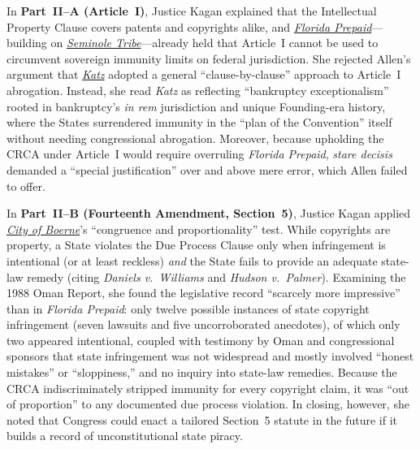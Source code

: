 \documentclass[12pt]{article}
\begin{document}
In \textbf{Part~II--A (Article~I)}, Justice Kagan explained that the Intellectual Property Clause covers patents and copyrights alike, and \href{https://supreme.justia.com/cases/federal/us/527/627/}{\textit{Florida Prepaid}}---building on \href{https://supreme.justia.com/cases/federal/us/517/44/}{\textit{Seminole Tribe}}---already held that Article~I cannot be used to circumvent sovereign immunity limits on federal jurisdiction. She rejected Allen's argument that \href{https://supreme.justia.com/cases/federal/us/546/356/}{\textit{Katz}} adopted a general ``clause-by-clause'' approach to Article~I abrogation. Instead, she read \textit{Katz} as reflecting ``bankruptcy exceptionalism'' rooted in bankruptcy's \textit{in rem} jurisdiction and unique Founding-era history, where the States surrendered immunity in the ``plan of the Convention'' itself without needing congressional abrogation. Moreover, because upholding the CRCA under Article~I would require overruling \textit{Florida Prepaid}, \textit{stare decisis} demanded a ``special justification'' over and above mere error, which Allen failed to offer.

In \textbf{Part~II--B (Fourteenth Amendment, Section~5)}, Justice Kagan applied \href{https://supreme.justia.com/cases/federal/us/521/507/}{\textit{City of Boerne}}'s ``congruence and proportionality'' test. While copyrights are property, a State violates the Due Process Clause only when infringement is intentional (or at least reckless) \textit{and} the State fails to provide an adequate state-law remedy (citing \textit{Daniels v.\ Williams} and \textit{Hudson v.\ Palmer}). Examining the 1988 Oman Report, she found the legislative record ``scarcely more impressive'' than in \textit{Florida Prepaid}: only twelve possible instances of state copyright infringement (seven lawsuits and five uncorroborated anecdotes), of which only two appeared intentional, coupled with testimony by Oman and congressional sponsors that state infringement was not widespread and mostly involved ``honest mistakes'' or ``sloppiness,'' and no inquiry into state-law remedies. Because the CRCA indiscriminately stripped immunity for every copyright claim, it was ``out of proportion'' to any documented due process violation. In closing, however, she noted that Congress could enact a tailored Section~5 statute in the future if it builds a record of unconstitutional state piracy.
\end{document}
